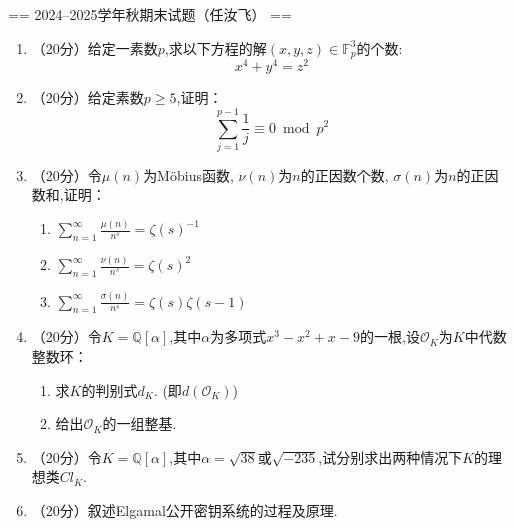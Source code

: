 == 2024--2025学年秋期末试题（任汝飞） ==

\begin{enumerate}
    \item（20分）给定一素数$p$,求以下方程的解$(x,y,z)\in\mathbb{F}_{p}^{3}$的个数:
    \[
    x^{4}+y^{4}=z^{2}
    \]

    \item（20分）给定素数$p\geq 5$,证明：
    \[
    \sum_{j=1}^{p-1}\frac{1}{j}\equiv 0 \bmod p^{2}
    \]

    \item（20分）令$\mu(n)$为Möbius函数, $\nu(n)$为$n$的正因数个数, $\sigma(n)$为$n$的正因数和,证明：\\
    \begin{enumerate}[label=(\arabic*)]
        \item $\displaystyle\sum_{n=1}^{\infty}\frac{\mu(n)}{n^{s}}=\zeta(s)^{-1}$
        \item $\displaystyle\sum_{n=1}^{\infty}\frac{\nu(n)}{n^{s}}=\zeta(s)^{2}$
        \item $\displaystyle\sum_{n=1}^{\infty}\frac{\sigma(n)}{n^{s}}=\zeta(s)\zeta(s-1)$
    \end{enumerate}

    \item（20分）令$K=\mathbb{Q}[\alpha]$,其中$\alpha$为多项式$x^{3}-x^{2}+x-9$的一根,设$\mathcal{O}_{K}$为$K$中代数整数环：\\
    \begin{enumerate}[label=(\arabic*)]
        \item 求$K$的判别式$d_{K}$. (即$d(\mathcal{O}_{K})$)
        \item 给出$\mathcal{O}_{K}$的一组整基.
    \end{enumerate}

    \item（20分）令$K=\mathbb{Q}[\alpha]$,其中$\alpha=\sqrt{38}$或$\sqrt{-235}$,试分别求出两种情况下$K$的理想类$Cl_{K}$.

    \item（20分）叙述Elgamal公开密钥系统的过程及原理.
\end{enumerate}

